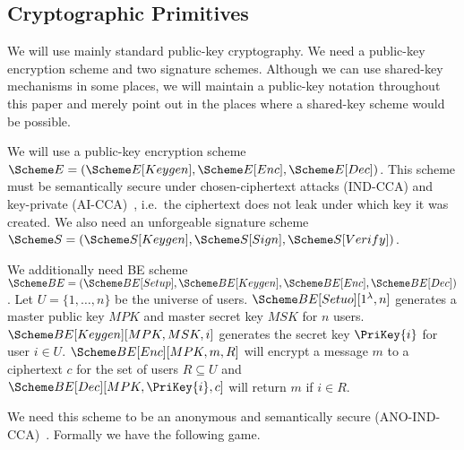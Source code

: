 \subsection{Cryptographic Primitives}
\label{CryptoPrimitives}

We will use mainly standard public-key cryptography.
We need a public-key encryption scheme and two signature schemes.
Although we can use shared-key mechanisms in some places, we will maintain 
a public-key notation throughout this paper and merely point out in the places 
where a shared-key scheme would be possible.

We will use a public-key encryption scheme \(\E = (\E[Keygen], \E[Enc], 
  \E[Dec])\).
This scheme must be semantically secure under chosen-ciphertext attacks 
(IND-CCA) and key-private (AI-CCA)~\cite{KeyPrivacy}, i.e.\ the ciphertext does 
not leak under which key it was created.
We also need an unforgeable signature scheme \(\S = (\S[Keygen], \S[Sign], 
  \S[Verify])\).

We additionally need \ac{BE} scheme \(\BE = (\BE[Setup], \BE[Keygen], \BE[Enc], 
  \BE[Dec])\).
Let \(U = \{1, \ldots, n\}\) be the universe of users.
\(\BE[Setuo][1^\lambda, n]\) generates a master public key \(MPK\) and master 
secret key \(MSK\) for \(n\) users.
\(\BE[Keygen][MPK, MSK, i]\) generates the secret key \(\PriKey{i}\) for user 
\(i\in U\).
\(\BE[Enc][MPK, m, R]\) will encrypt a message \(m\) to a ciphertext \(c\) for 
the set of users \(R\subseteq U\) and \(\BE[Dec][MPK, \PriKey{i}, c]\) will 
return \(m\) if \(i\in R\).

We need this scheme to be an anonymous and semantically secure 
(ANO-IND-CCA)~\cite{ANOBE}.
Formally we have the following game.

